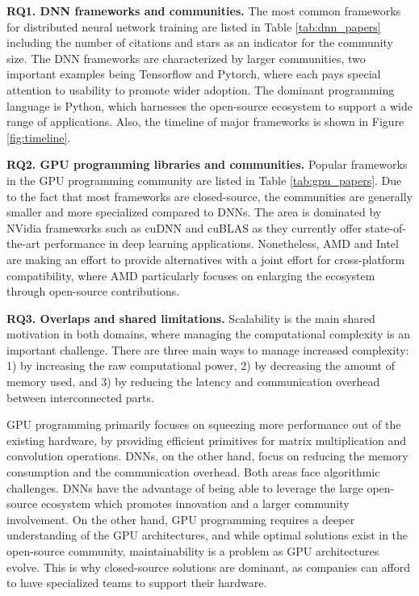 \textbf{RQ1. DNN frameworks and communities.}
The most common frameworks for distributed neural network training are listed in Table
\ref{tab:dnn_papers} including the number of citations and stars as an indicator for the community
size. The DNN frameworks are characterized by larger communities, two important examples being
Tensorflow and Pytorch, where each pays special attention to usability to promote wider adoption.
The dominant programming language is Python, which harnesses the open-source ecosystem to support a
wide range of applications. Also, the timeline of major frameworks is shown in Figure
\ref{fig:timeline}.

\textbf{RQ2. GPU programming libraries and communities.}
Popular frameworks in the GPU programming community are listed in Table \ref{tab:gpu_papers}. Due
to the fact that most frameworks are closed-source, the communities are generally smaller and more
specialized compared to DNNs. The area is dominated by NVidia frameworks such as cuDNN and cuBLAS
as they currently offer state-of-the-art performance in deep learning applications. Nonetheless,
AMD and Intel are making an effort to provide alternatives with a joint effort for cross-platform
compatibility, where AMD particularly focuses on enlarging the ecosystem through open-source
contributions.

\textbf{RQ3. Overlaps and shared limitations.}
Scalability is the main shared motivation in both domains, where managing the computational
complexity is an important challenge. There are three main ways to manage increased complexity: 1)
by increasing the raw computational power, 2) by decreasing the amount of memory used, and 3) by
reducing the latency and communication overhead between interconnected parts.

GPU programming primarily focuses on squeezing more performance out of the existing hardware, by
providing efficient primitives for matrix multiplication and convolution operations. DNNs, on the
other hand, focus on reducing the memory consumption and the communication overhead. Both areas
face algorithmic challenges. DNNs have the advantage of being able to leverage the large
open-source ecosystem which promotes innovation and a larger community involvement. On the other
hand, GPU programming requires a deeper understanding of the GPU architectures, and while optimal
solutions exist in the open-source community, maintainability is a problem as GPU architectures
evolve. This is why closed-source solutions are dominant, as companies can afford to have
specialized teams to support their hardware.

